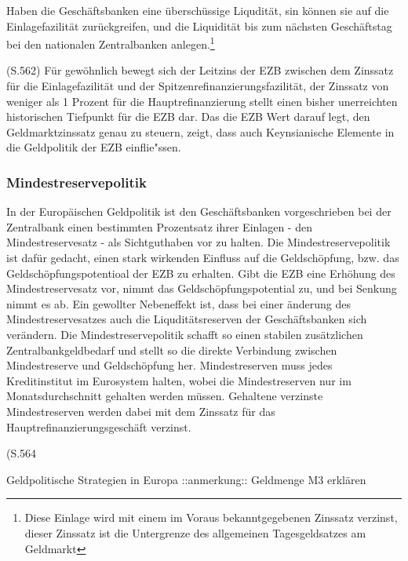 \documentclass[
  onecolumn,
  a4paper,
  abstracton,
  parskip=half
  ,final
  ]{scrartcl}
\begin{document}
Haben die Gesch{\"a}ftsbanken eine {\"u}bersch{\"u}ssige Liqudit{\"a}t, sin k{\"o}nnen sie auf die Einlagefazilit{\"a}t zur{\"u}ckgreifen, und die Liquidit{\"a}t bis zum n{\"a}chsten Gesch{\"a}ftstag bei den nationalen Zentralbanken anlegen.\footnote[37]{Diese Einlage wird mit einem im Voraus bekanntgegebenen Zinssatz verzinst, dieser Zinssatz ist die Untergrenze des allgemeinen Tagesgeldsatzes am Geldmarkt}

(S.562)
F{\"u}r gew{\"o}hnlich bewegt sich der Leitzins der EZB zwischen dem Zinssatz f{\"u}r die Einlagefazilit{\"a}t und der Spitzenrefinanzierungsfazilit{\"a}t, der Zinssatz von weniger als 1 Prozent f{\"u}r die Hauptrefinanzierung stellt einen bisher unerreichten historischen Tiefpunkt f{\"u}r die EZB dar.
Das die EZB Wert darauf legt, den Geldmarktzinssatz genau zu steuern, zeigt, dass auch Keynsianische Elemente in die Geldpolitik der EZB einflie{"ss}en.


\subsubsection{Mindestreservepolitik} \citep[vgl.][S.562f]{Basseler2010}
In der Europ{\"a}ischen Geldpolitik ist den Gesch{\"a}ftsbanken vorgeschrieben bei der Zentralbank einen bestimmten Prozentsatz ihrer Einlagen - den Mindestreservesatz - als Sichtguthaben vor zu halten. Die Mindestreservepolitik ist daf{\"u}r gedacht, einen stark wirkenden Einfluss auf die Geldsch{\"o}pfung, bzw. das Geldsch{\"o}pfungspotentioal der EZB zu erhalten. Gibt die EZB eine Erh{\"o}hung des Mindestreservesatz vor, nimmt das Geldsch{\"o}pfungspotential zu, und bei Senkung nimmt es ab. Ein gewollter Nebeneffekt ist, dass bei einer {\"a}nderung des Mindestreservesatzes auch die Liqudit{\"a}tsreserven der Gesch{\"a}ftsbanken sich ver{\"a}ndern.
Die Mindestreservepolitik schafft so einen stabilen zus{\"a}tzlichen Zentralbankgeldbedarf und stellt so die direkte Verbindung zwischen Mindestreserve und Geldsch{\"o}pfung her.
Mindestreserven muss jedes Kreditinstitut im Eurosystem halten, wobei die Mindestreserven nur im Monatsdurchschnitt gehalten werden m{\"u}ssen. Gehaltene verzinste Mindestreserven werden dabei mit dem Zinssatz f{\"u}r das Hauptrefinanzierungsgesch{\"a}ft verzinst.


(S.564\citep[vgl.][S.564-568]{Basseler2010}

Geldpolitische Strategien in Europa
::anmerkung:: Geldmenge M3 erkl{\"a}ren
\end{document}
